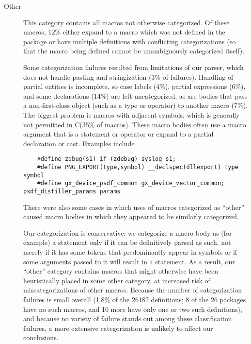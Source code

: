 \documentclass[10pt]{article}
\def\numpackages{26}
\def\nummacrodefs{26182}        %
\begin{document}
\begin{description}
\item[Other]
  This category contains all macros not otherwise categorized.  
  Of these macros, 12\% either expand to a macro
  which was not defined in the package or have multiple definitions with
  conflicting categorizations (so that the macro being defined cannot be
  unambiguously categorized itself).
  
  Some categorization failures resulted from limitations of our parser, which does not
  handle pasting and stringization (3\% of failures).  Handling of partial
  entities is incomplete, so case labels (4\%), partial expressions (6\%),
  and some declarations (14\%) are left uncategorized, as are bodies that
  pass a non-first-class object (such as a type or operator) to another
  macro (7\%).  The biggest problem is macros with adjacent symbols, which
  is generally not permitted in C\@ (35\% of macros).  These macro bodies
  often use a macro argument that is a statement or operator or expand to
  a partial declaration or cast.  Examples include
\begin{verbatim}
    #define zdbug(s1) if (zdebug) syslog s1;
    #define PNG_EXPORT(type,symbol) __declspec(dllexport) type symbol
    #define gx_device_psdf_common gx_device_vector_common; psdf_distiller_params params
\end{verbatim}
  There were also some cases in which uses of macros categorized as
  ``other'' caused macro bodies in which they appeared to be similarly
  categorized.
  
  Our categorization is conservative:
  we categorize a macro body as (for example) a statement only if it can be
  definitively parsed as such, not merely if it has some tokens that
  predominantly appear in symbols or if some arguments passed to it will
  result in a statement.  As a result, our ``other'' category contains
  macros that might otherwise have been heuristically placed in some other category, at
  increased risk of miscategorizations of other macros.  Because the number
  of categorization failures is small overall (1.8\% of the {\nummacrodefs}
  definitions; 8 of the {\numpackages} packages have no such macros, and 10
  more have only one or two such definitions), and because no variety of
  failure stands out among these classification failures, a more extensive
  categorization is unlikely to affect our conclusions.

\end{description}
\end{document}
